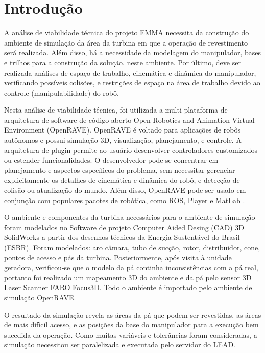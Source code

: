 \section{Introdução}
A análise de viabilidade técnica do projeto EMMA necessita da construção do
ambiente de simulação da área da turbina em que a operação de revestimento será
realizada. Além disso, há a necessidade da modelagem do manipulador, bases e
trilhos para a construção da solução, neste ambiente. Por último, deve ser
realizada análises de espaço de trabalho, cinemática e dinâmica do manipulador,
verificando possíveis colisões, e restrições de espaço na área de trabalho
devido ao controle (manipulabilidade) do robô. 

Nesta análise de viabilidade técnica, foi utilizada a 
multi-plataforma de arquitetura de software de código aberto Open
Robotics and Animation Virtual Environment (OpenRAVE). OpenRAVE é voltado para
aplicações de robôs autônomos e possui simulação 3D, visualização, planejamento,
e controle. A arquitetura de plugin permite ao usuário desenvolver controladores
customizados ou estender funcionalidades. O desenvolvedor pode se
concentrar em planejamento e aspectos específicos do problema, sem necessitar
gerenciar explicitamente os detalhes de cinemática e dinâmica do robô, e
detecção de colisão ou atualização do mundo. Além disso, OpenRAVE pode ser usado
em conjunção com populares pacotes de robótica, como ROS, Player e MatLab
\cite{diankov2008openrave}. 

O ambiente e componentes da turbina necessários para o ambiente de simulação
foram modelados no Software de projeto Computer Aided Desing (CAD) 3D SolidWorks
a partir dos desenhos técnicos da Energia Sustentável do Brasil (ESBR). Foram modelados: aro câmara,
tubo de sucção, rotor, distribuidor, cone, pontos de acesso e pás da turbina.
Posteriormente, após visita à unidade geradora, verificou-se que o modelo da pá
continha inconsistências com a pá real, portanto foi realizado um mapeamento 3D
do ambiente e da pá pelo sensor 3D Laser Scanner FARO Focus3D. Todo o ambiente é
importado pelo ambiente de simulação OpenRAVE.

O resultado da simulação revela as áreas da pá que podem ser revestidas, as
áreas de mais difícil acesso, e as posições da base do manipulador para a
execução bem sucedida da operação. Como muitas variáveis e tolerâncias foram
consideradas, a simulação necessitou ser paralelizada e executada pelo servidor
do LEAD.
